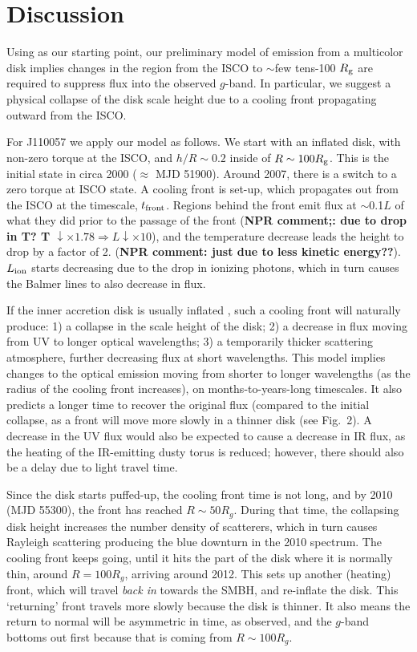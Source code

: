 \documentclass{nature}
\begin{document}
\section{Discussion}   
Using \cite{Sirko_Goodman2003} as our starting point, our preliminary
model \citep{Ford2018} of emission from a multicolor disk implies
changes in the region from the ISCO to $\sim$few tens-100 $R_{\rm g}$
are required to suppress flux into the observed $g$-band. In
particular, we suggest a physical collapse of the disk scale height
due to a cooling front propagating outward from the ISCO.

For J110057 we apply our model as follows. We start with an inflated
disk, with non-zero torque at the ISCO, and $h/R\sim0.2$ inside of
$R\sim100 R_{\rm g}$.  This is the initial state in circa 2000
($\approx$ MJD 51900).  Around 2007, there is a switch to a zero
torque at ISCO state. A cooling front is set-up, which propagates out
from the ISCO at the timescale, $t_{\rm front}$. Regions behind the
front emit flux at $\sim$0.1$L$ of what they did prior to the passage
of the front ({\bf NPR comment;: due to drop in T?  T $\downarrow
\times 1.78 \Rightarrow L \downarrow \times10$}), and the temperature
decrease leads the height to drop by a factor of 2.  ({\bf NPR
comment: just due to less kinetic energy??}).  $L_{\rm ion}$ starts
decreasing due to the drop in ionizing photons, which in turn causes
the Balmer lines to also decrease in flux.

If the inner accretion disk is usually inflated
\cite[e.g.,see][]{Sirko_Goodman2003, Thompson2005,
Hopkins_Quataert2011}, such a cooling front will naturally produce: 1)
a collapse in the scale height of the disk; 2) a decrease in flux
moving from UV to longer optical wavelengths; 3) a temporarily thicker
scattering atmosphere, further decreasing flux at short wavelengths.
This model implies changes to the optical emission moving from shorter
to longer wavelengths (as the radius of the cooling front increases),
on months-to-years-long timescales. It also predicts a longer time to
recover the original flux (compared to the initial collapse, as a
front will move more slowly in a thinner disk (see Fig.~2). A decrease
in the UV flux would also be expected to cause a decrease in IR flux,
as the heating of the IR-emitting dusty torus is reduced; however,
there should also be a delay due to light travel time.

Since the disk starts puffed-up, the cooling front time is not long,
and by 2010 (MJD 55300), the front has reached $R\sim50 R_{g}$. During
that time, the collapsing disk height increases the number density of
scatterers, which in turn causes Rayleigh scattering producing the
blue downturn in the 2010 spectrum.  The cooling front keeps going,
until it hits the part of the disk where it is normally thin, around
$R=100 R_g$, arriving around 2012. This sets up another (heating)
front, which will travel {\it back in} towards the SMBH, and
re-inflate the disk. This `returning' front travels more slowly
because the disk is thinner. It also means the return to normal will
be asymmetric in time, as observed, and the $g$-band bottoms out first
because that is coming from $R\sim100R_{g}$.
\end{document}
